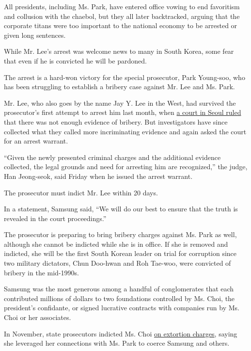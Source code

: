 All presidents, including Ms. Park, have entered office vowing to end
favoritism and collusion with the chaebol, but they all later
backtracked, arguing that the corporate titans were too important to the
national economy to be arrested or given long sentences.

While Mr. Lee's arrest was welcome news to many in South Korea, some
fear that even if he is convicted he will be pardoned.

The arrest is a hard-won victory for the special prosecutor, Park
Young-soo, who has been struggling to establish a bribery case against
Mr. Lee and Ms. Park.

Mr. Lee, who also goes by the name Jay Y. Lee in the West, had survived
the prosecutor's first attempt to arrest him last month, when
\href{https://www.nytimes3xbfgragh.onion/2017/01/18/world/asia/samsung-korea-president-impeachment.html}{a
court in Seoul ruled} that there was not enough evidence of bribery. But
investigators have since collected what they called more incriminating
evidence and again asked the court for an arrest warrant.

``Given the newly presented criminal charges and the additional evidence
collected, the legal grounds and need for arresting him are
recognized,'' the judge, Han Jeong-seok, said Friday when he issued the
arrest warrant.

The prosecutor must indict Mr. Lee within 20 days.

In a statement, Samsung said, ``We will do our best to ensure that the
truth is revealed in the court proceedings.''

The prosecutor is preparing to bring bribery charges against Ms. Park as
well, although she cannot be indicted while she is in office. If she is
removed and indicted, she will be the first South Korean leader on trial
for corruption since two military dictators, Chun Doo-hwan and Roh
Tae-woo, were convicted of bribery in the mid-1990s.

Samsung was the most generous among a handful of conglomerates that each
contributed millions of dollars to two foundations controlled by Ms.
Choi, the president's confidante, or signed lucrative contracts with
companies run by Ms. Choi or her associates.

In November, state prosecutors indicted Ms. Choi
\href{https://www.nytimes3xbfgragh.onion/2016/11/20/world/asia/park-geun-hye-south-korea-extortion-accomplice-prosecutors.html}{on
extortion charges}, saying she leveraged her connections with Ms. Park
to coerce Samsung and others.

